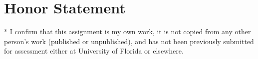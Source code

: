 \documentclass[conference]{IEEEtran}
\begin{document}

\section*{Honor Statement}
\noindent
* I confirm that this assignment is my own work, it is not copied from any other person's work (published or unpublished), and has not been previously submitted for assessment either at University of Florida or elsewhere.




%
\end{document}
